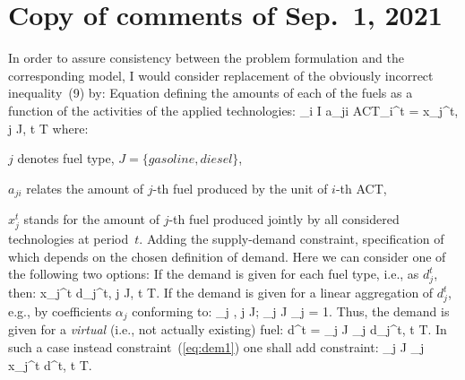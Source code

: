 \documentclass[a4paper,12pt]{article}
\begin{document}
\section*{Copy of comments of Sep.~1, 2021}
In order to assure consistency between the problem formulation and the
corresponding model, I would consider replacement of the obviously incorrect
inequality~(9) by:
\inum Equation defining the amounts of each of the fuels as a function of
the activities of the applied technologies:
	\be
	\sum_{i \in I} a_{ji} \cdot ACT_i^t = x_j^t, \quad j \in J,\; t \in T
	\ee
	where:
	\btlbs
	\item $j$ denotes fuel type, $J = \{gasoline, diesel\}$,
	\item $a_{ji}$ relates the amount of $j$-th fuel produced by the unit of
		$i$-th ACT,
	\item $x_j^t$ stands for the amount of $j$-th fuel produced jointly by all
		considered technologies at period~$t$.
	\etls
\inum Adding the supply-demand constraint, specification of which depends on the
	chosen definition of demand. Here we can consider one of the following two options:
	\inums If the demand is given for each fuel type, i.e., as $d_j^t$, then:
		\be\label{eq:dem1}
		x_j^t \ge d_j^t, \quad j \in J,\; t \in T.
		\ee
	\inums If the demand is given for a linear aggregation of $d_j^t$, e.g.,
		by coefficients $\alpha_j$ conforming to:
		 \le \alpha_j ,\; \forall j \in J; \quad \sum_{j \in J} \alpha_j = 1.
		\ee
		Thus, the demand is given for a {\em virtual} (i.e., not actually existing)
		fuel:
		\be
			d^t = \sum_{j \in J} \alpha_j \cdot d_j^t, \quad t \in T.
		\ee
		In such a case instead constraint~(\ref{eq:dem1}) one shall add constraint:
		\be
		\sum_{j \in J} \alpha_j \cdot x_j^t \ge d^t, \quad t \in T.
		\ee
	\etls
\etl
\end{document}
